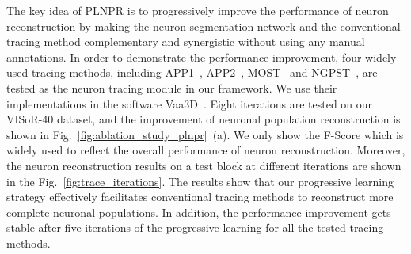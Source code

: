 The key idea of PLNPR is to progressively improve the performance of neuron reconstruction by making the neuron segmentation network and the conventional tracing method complementary and synergistic without using any manual annotations.
In order to demonstrate the performance improvement, four widely-used tracing methods, including APP1~\cite{Peng2011}, APP2~\cite{Xiao2013}, MOST~\cite{Wu2014} and NGPST~\cite{Quan2015}, are tested as the neuron tracing module in our framework. 
We use their implementations in the software Vaa3D~\cite{Peng2014}. 
%
Eight iterations are tested on our VISoR-40 dataset, and the improvement of neuronal population reconstruction is shown in Fig.~\ref{fig:ablation_study_plnpr}~(a).
We only show the F-Score which is widely used to reflect the overall performance of neuron reconstruction.
%
Moreover, the neuron reconstruction results on a test block at different iterations are shown in the Fig.~\ref{fig:trace_iterations}.
%
The results show that our progressive learning strategy effectively facilitates conventional tracing methods to reconstruct more complete neuronal populations.
In addition, the performance improvement gets stable after five iterations of the progressive learning for all the tested tracing methods. 

 

